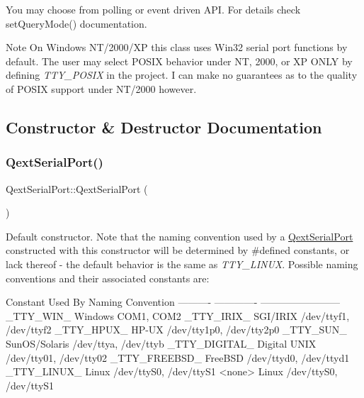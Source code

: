 You may choose from polling or event driven A\+PI. For details check set\+Query\+Mode() documentation.

\begin{DoxyNote}{Note}
On Windows N\+T/2000/\+XP this class uses Win32 serial port functions by default. The user may select P\+O\+S\+IX behavior under NT, 2000, or XP O\+N\+LY by defining {\itshape T\+T\+Y\+\_\+\+P\+O\+S\+IX} in the project. I can make no guarantees as to the quality of P\+O\+S\+IX support under N\+T/2000 however. 
\end{DoxyNote}


\subsection{Constructor \& Destructor Documentation}
\mbox{\label{class_qext_serial_port_a6aba59fc97222d64653f94c491747ffd}} 
\subsubsection{\texorpdfstring{Qext\+Serial\+Port()}{QextSerialPort()}\hspace{0.1cm}{\footnotesize\ttfamily [1/5]}}
{\footnotesize\ttfamily Qext\+Serial\+Port\+::\+Qext\+Serial\+Port (\begin{DoxyParamCaption}{ }\end{DoxyParamCaption})}

Default constructor. Note that the naming convention used by a \mbox{\hyperlink{class_qext_serial_port}{Qext\+Serial\+Port}} constructed with this constructor will be determined by \#defined constants, or lack thereof -\/ the default behavior is the same as {\itshape T\+T\+Y\+\_\+\+L\+I\+N\+UX}. Possible naming conventions and their associated constants are\+:

\begin{DoxyVerb}Constant         Used By         Naming Convention
----------       -------------   ------------------------
_TTY_WIN_        Windows         COM1, COM2
_TTY_IRIX_       SGI/IRIX        /dev/ttyf1, /dev/ttyf2
_TTY_HPUX_       HP-UX           /dev/tty1p0, /dev/tty2p0
_TTY_SUN_        SunOS/Solaris   /dev/ttya, /dev/ttyb
_TTY_DIGITAL_    Digital UNIX    /dev/tty01, /dev/tty02
_TTY_FREEBSD_    FreeBSD         /dev/ttyd0, /dev/ttyd1
_TTY_LINUX_      Linux           /dev/ttyS0, /dev/ttyS1
<none>           Linux           /dev/ttyS0, /dev/ttyS1
\end{DoxyVerb}


